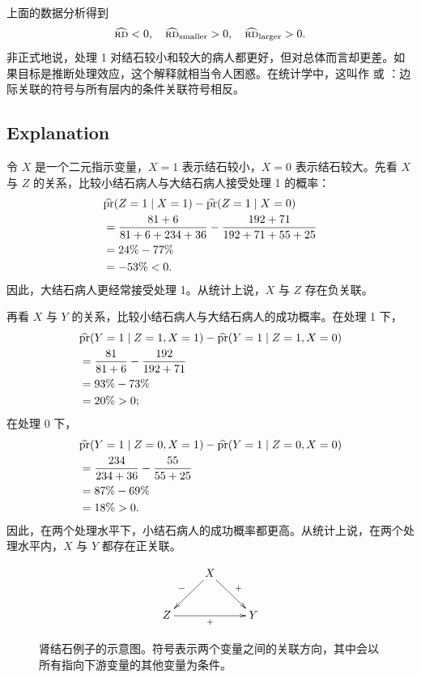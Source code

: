 上面的数据分析得到
\[
\widehat{\textsc{rd}}<0,\quad
\widehat{\textsc{rd}}_{\text{smaller}}>0,\quad
\widehat{\textsc{rd}}_{\text{larger}}>0 .
\]
非正式地说，处理 1 对结石较小和较大的病人都更好，但对总体而言却更差。如果目标是推断处理效应，这个解释就相当令人困惑。在统计学中，这叫作  或 ：边际关联的符号与所有层内的条件关联符号相反。

\subsection{Explanation}

令 $X$ 是一个二元指示变量，$X=1$ 表示结石较小，$X=0$ 表示结石较大。先看 $X$ 与 $Z$ 的关系，比较小结石病人与大结石病人接受处理 1 的概率：
\begin{align*}
&\widehat{\textup{pr}}(Z=1\mid X=1)-\widehat{\textup{pr}}(Z=1\mid X=0)\\
&=
\frac{81+6}{81+6+234+36}
-\frac{192+71}{192+71+55+25}\\
&= 24\%-77\%\\
&= -53\%<0 .
\end{align*}
因此，大结石病人更经常接受处理 1。从统计上说，$X$ 与 $Z$ 存在负关联。

再看 $X$ 与 $Y$ 的关系，比较小结石病人与大结石病人的成功概率。在处理 1 下，
\begin{align*}
&\widehat{\textup{pr}}(Y=1\mid Z=1,X=1)
-\widehat{\textup{pr}}(Y=1\mid Z=1,X=0)\\
&= \frac{81}{81+6}-\frac{192}{192+71}\\
&= 93\%-73\%\\
&=20\%>0;
\end{align*}
在处理 0 下，
\begin{align*}
&\widehat{\textup{pr}}(Y=1\mid Z=0,X=1)
-\widehat{\textup{pr}}(Y=1\mid Z=0,X=0)\\
&= \frac{234}{234+36}-\frac{55}{55+25}\\
&= 87\%-69\%\\
&=18\%>0 .
\end{align*}
因此，在两个处理水平下，小结石病人的成功概率都更高。从统计上说，在两个处理水平内，$X$ 与 $Y$ 都存在正关联。

\begin{figure}[H]
\[
\xymatrix{
 & X\ar_{-}[ld]\ar^{+}[rd] \\
Z \ar_{+}[rr] &&Y
}
\]
\caption{肾结石例子的示意图。符号表示两个变量之间的关联方向，其中会以所有指向下游变量的其他变量为条件。}
\label{fig::kidney-stone}
\end{figure}

